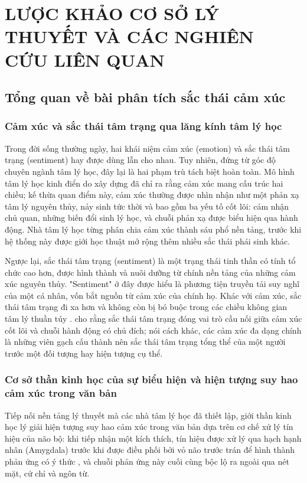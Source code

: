 \chapter{LƯỢC KHẢO CƠ SỞ LÝ THUYẾT VÀ CÁC NGHIÊN CỨU LIÊN QUAN}
\label{Chapter2}

\section{Tổng quan về bài phân tích sắc thái cảm xúc}

\subsection{Cảm xúc và sắc thái tâm trạng qua lăng kính tâm lý học}
Trong đời sống thường ngày, hai khái niệm cảm xúc (emotion) và sắc thái tâm trạng (sentiment) hay được dùng lẫn cho nhau. Tuy nhiên, đứng từ góc độ chuyên ngành tâm lý học, đây lại là hai phạm trù tách biệt hoàn toàn. Mô hình tâm lý học kinh điển do \textcite{watson1985toward} xây dựng đã chỉ ra rằng cảm xúc mang cấu trúc hai chiều; kế thừa quan điểm này, cảm xúc thường được nhìn nhận như một phản xạ tâm lý nguyên thủy, nảy sinh tức thời và bao gồm ba yếu tố cốt lõi: cảm nhận chủ quan, những biến đổi sinh lý học, và chuỗi phản xạ được biểu hiện qua hành động. Nhà tâm lý học \textcite{ekman1992there} từng phân chia cảm xúc thành sáu phổ nền tảng, trước khi hệ thống này được giới học thuật mở rộng thêm nhiều sắc thái phái sinh khác.

Ngược lại, sắc thái tâm trạng (sentiment) là một trạng thái tinh thần có tính tổ chức cao hơn, được hình thành và nuôi dưỡng từ chính nền tảng của những cảm xúc nguyên thủy. "Sentiment" ở đây được hiểu là phương tiện truyền tải suy nghĩ của một cá nhân, vốn bắt nguồn từ cảm xúc của chính họ. Khác với cảm xúc, sắc thái tâm trạng đi xa hơn và không còn bị bó buộc trong các chiều không gian tâm lý thuần túy \parencite{yue2019survey}. \textcite{mcdougall2015introduction} cho rằng sắc thái tâm trạng đóng vai trò cầu nối giữa cảm xúc cốt lõi và chuỗi hành động có chủ đích; nói cách khác, các cảm xúc đa dạng chính là những viên gạch cấu thành nên sắc thái tâm trạng tổng thể của một người trước một đối tượng hay hiện tượng cụ thể.

\subsection{Cơ sở thần kinh học của sự biểu hiện và hiện tượng suy hao cảm xúc trong văn bản}
\label{subsec:cs_than_kinh}
Tiếp nối nền tảng lý thuyết mà các nhà tâm lý học đã thiết lập, giới thần kinh học lý giải hiện tượng suy hao cảm xúc trong văn bản dựa trên cơ chế xử lý tín hiệu của não bộ: khi tiếp nhận một kích thích, tín hiệu được xử lý qua hạch hạnh nhân (Amygdala) trước khi được điều phối bởi vỏ não trước trán để hình thành phản ứng có ý thức \parencite{ledoux2013emotion}, và chuỗi phản ứng này cuối cùng bộc lộ ra ngoài qua nét mặt, cử chỉ và ngôn từ.

